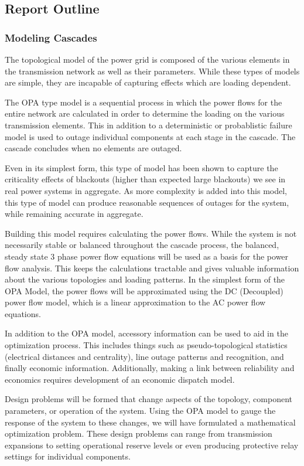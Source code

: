\documentclass[class=report]{standalone}
\begin{document}
\subsection{Report Outline}

\subsubsection{Modeling Cascades}
The topological model of the power grid is composed of the various elements in the transmission network as well as their parameters.  While these types of models are simple, they are incapable of capturing effects which are loading dependent. 

The OPA type model is a sequential process in which the power flows for the entire network are calculated in order to determine the loading on the various transmission elements.  This in addition to a deterministic or probablistic failure model is used to outage individual components at each stage in the cascade.  The cascade concludes when no elements are outaged.

Even in its simplest form, this type of model has been shown to capture the criticality effects of blackouts (higher than expected large blackouts) we see in real power systems in aggregate.  As more complexity is added into this model, this type of model can produce reasonable sequences of outages for the system, while remaining accurate in aggregate. 

Building this model requires calculating the power flows.  While the system is not necessarily stable or balanced throughout the cascade process, the balanced, steady state 3 phase power flow equations will be used as a basis for the power flow analysis.  This keeps the calculations tractable and gives valuable information about the various topologies and loading patterns.  In the simplest form of the OPA Model, the power flows will be approximated using the DC (Decoupled) power flow model, which is a linear approximation to the AC power flow equations.

In addition to the OPA model, accessory information can be used to aid in the optimization process.  This includes things such as pseudo-topological statistics (electrical distances and centrality), line outage patterns and recognition, and finally economic information.  Additionally, making a link between reliability and economics requires development of an economic dispatch model.

Design problems will be formed that change aspects of the topology, component parameters, or operation of the system.  Using the OPA model to gauge the response of the system to these changes, we will have formulated a mathematical optimization problem.  These design problems can range from transmission expansions to setting operational reserve levels or even producing protective relay settings for individual components.
\end{document}
